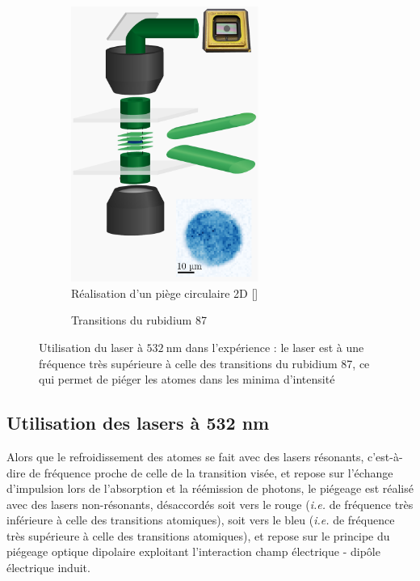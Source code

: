 \documentclass[11pt,a4paper] { article}
\newcommand{\ncite}[1]{[\citenum{#1}]}
\newcommand{\lmbd}[1]{$\SI{#1}{\nano\metre}$}
\begin{document}
\begin{figure}[htbp] 
	\centering
	\begin{subfigure}[b]{0.48\textwidth}
    	\centering
    	\small
	\includegraphics[height=9cm]{img/accordeon-dmd.pdf}
	\caption{\small Réalisation d'un piège circulaire 2D \ncite{ville}} %
		\label{fig:accordeon}
	\end{subfigure}	
	\begin{subfigure}[b]{0.48\textwidth}
		\centering
		\small
		\resizebox{!}{9cm}{
   			
		}
		\caption{\small Transitions du rubidium 87}
		\label{fig:transitions}
	\end{subfigure}

	\caption{Utilisation du laser à \lmbd{532} dans l'expérience : \small le laser est à une fréquence très supérieure à celle des transitions du rubidium 87, ce qui permet de piéger les atomes dans les minima d'intensité}
\end{figure}



\subsection{Utilisation des lasers à 532 nm}

Alors que le refroidissement des atomes se fait avec des lasers résonants, c'est-à-dire de fréquence proche de celle de la transition visée, et repose sur l'échange d'impulsion lors de l'absorption et la réémission de photons, le piégeage est réalisé avec des lasers non-résonants, désaccordés soit vers le rouge (\textit{i.e.} de fréquence très inférieure à celle des transitions atomiques), soit vers le bleu (\textit{i.e.} de fréquence très supérieure à celle des transitions atomiques), et repose sur le principe du piégeage optique dipolaire exploitant l'interaction champ électrique - dipôle électrique induit.
\end{document}
